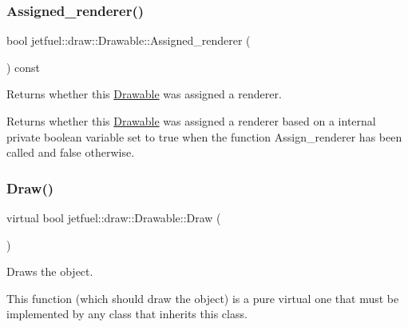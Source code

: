 \mbox{\label{classjetfuel_1_1draw_1_1Drawable_a6def0c6a514cb41cf4791191c06b4c3a}} 
\subsubsection{\texorpdfstring{Assigned\+\_\+renderer()}{Assigned\_renderer()}}
{\footnotesize\ttfamily bool jetfuel\+::draw\+::\+Drawable\+::\+Assigned\+\_\+renderer (\begin{DoxyParamCaption}{ }\end{DoxyParamCaption}) const\hspace{0.3cm}{\ttfamily [inline]}}



Returns whether this \hyperlink{classjetfuel_1_1draw_1_1Drawable}{Drawable} was assigned a renderer. 

Returns whether this \hyperlink{classjetfuel_1_1draw_1_1Drawable}{Drawable} was assigned a renderer based on a internal private boolean variable set to true when the function Assign\+\_\+renderer has been called and false otherwise. \mbox{\label{classjetfuel_1_1draw_1_1Drawable_a1a072070322965ce9411ee6e7c311c56}} 
\subsubsection{\texorpdfstring{Draw()}{Draw()}}
{\footnotesize\ttfamily virtual bool jetfuel\+::draw\+::\+Drawable\+::\+Draw (\begin{DoxyParamCaption}{ }\end{DoxyParamCaption})\hspace{0.3cm}{\ttfamily [pure virtual]}}



Draws the object. 

This function (which should draw the object) is a pure virtual one that must be implemented by any class that inherits this class. 

